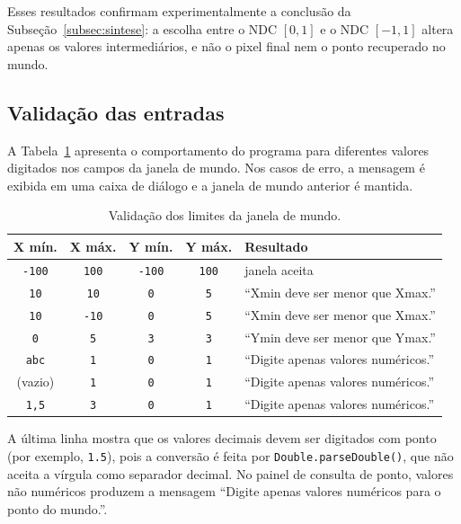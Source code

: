 Esses resultados confirmam experimentalmente a conclusão da Subseção~\ref{subsec:sintese}: a escolha entre o NDC $[0,1]$ e o NDC $[-1,1]$ altera apenas os valores intermediários, e não o pixel final nem o ponto recuperado no mundo.

\subsection{Validação das entradas}
\label{subsec:res-validacao}
A Tabela~\ref{tab:res-validacao} apresenta o comportamento do programa para diferentes valores digitados nos campos da janela de mundo. Nos casos de erro, a mensagem é exibida em uma caixa de diálogo e a janela de mundo anterior é mantida.

\begin{table}[H]
    \centering
    \renewcommand{\arraystretch}{1.35}
    \small
    \begin{tabular}{c|c|c|c|l}
        \textbf{X mín.} & \textbf{X máx.} & \textbf{Y mín.} & \textbf{Y máx.} & \textbf{Resultado} \\ \hline
        \texttt{-100} & \texttt{100} & \texttt{-100} & \texttt{100} & janela aceita \\
        \texttt{10}   & \texttt{10}  & \texttt{0}    & \texttt{5}   & ``Xmin deve ser menor que Xmax.'' \\
        \texttt{10}   & \texttt{-10} & \texttt{0}    & \texttt{5}   & ``Xmin deve ser menor que Xmax.'' \\
        \texttt{0}    & \texttt{5}   & \texttt{3}    & \texttt{3}   & ``Ymin deve ser menor que Ymax.'' \\
        \texttt{abc}  & \texttt{1}   & \texttt{0}    & \texttt{1}   & ``Digite apenas valores numéricos.'' \\
        (vazio)       & \texttt{1}   & \texttt{0}    & \texttt{1}   & ``Digite apenas valores numéricos.'' \\
        \texttt{1,5}  & \texttt{3}   & \texttt{0}    & \texttt{1}   & ``Digite apenas valores numéricos.''
    \end{tabular}
    \caption{Validação dos limites da janela de mundo.}
    \label{tab:res-validacao}
\end{table}

A última linha mostra que os valores decimais devem ser digitados com ponto (por exemplo, \texttt{1.5}), pois a conversão é feita por \texttt{Double.parseDouble()}, que não aceita a vírgula como separador decimal. No painel de consulta de ponto, valores não numéricos produzem a mensagem ``Digite apenas valores numéricos para o ponto do mundo.''.

